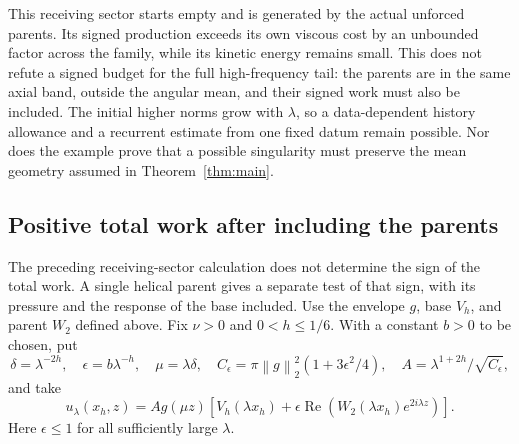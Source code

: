 \documentclass[11pt]{article}
\theoremstyle{remark}
\newcommand{\norm}[1]{\left\lVert#1\right\rVert}
\begin{document}
This receiving sector starts empty and is generated by the actual
unforced parents. Its signed production exceeds its own viscous cost
by an unbounded factor across the family, while its kinetic energy
remains small. This does not refute a signed budget for the full
high-frequency tail: the parents are in the same axial band, outside
the angular mean, and their signed work must also be included.
The initial higher norms grow with $\lambda$, so a data-dependent
history allowance and a recurrent estimate from one fixed datum
remain possible. Nor does the example prove that a possible singularity
must preserve the mean geometry assumed in Theorem~\ref{thm:main}.

\subsection{Positive total work after including the parents}

The preceding receiving-sector calculation does not determine the sign
of the total work. A single helical parent gives a separate test of that
sign, with its pressure and the response of the base included.
Use the envelope $g$, base $V_h$, and parent $W_2$ defined above. Fix
$\nu>0$ and $0<h\leq1/6$. With a constant $b>0$ to be chosen, put
\[
 \delta=\lambda^{-2h},\quad \epsilon=b\lambda^{-h},\quad
 \mu=\lambda\delta,\quad
 C_\epsilon=\pi\norm g_2^2(1+3\epsilon^2/4),\quad
 A=\lambda^{1+2h}/\sqrt{C_\epsilon},
\]
and take
\begin{equation}\label{eq:singleHelicalDatum}
 u_\lambda(x_h,z)=A g(\mu z)
       [V_h(\lambda x_h)+\epsilon\operatorname{Re}
                   (W_2(\lambda x_h)e^{2i\lambda z})].
\end{equation}
Here $\epsilon\leq1$ for all sufficiently large $\lambda$.
\end{document}
